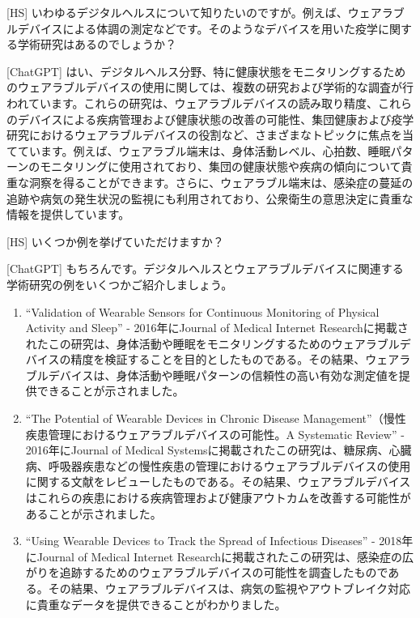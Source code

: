\documentclass[
]{book}
\providecommand{\tightlist}{%
  \setlength{\itemsep}{0pt}\setlength{\parskip}{0pt}}
\theoremstyle{definition}
\theoremstyle{definition}
\theoremstyle{definition}
\theoremstyle{definition}
\theoremstyle{remark}
\begin{document}
{[}HS{]} いわゆるデジタルヘルスについて知りたいのですが。例えば、ウェアラブルデバイスによる体調の測定などです。そのようなデバイスを用いた疫学に関する学術研究はあるのでしょうか？

{[}ChatGPT{]} はい、デジタルヘルス分野、特に健康状態をモニタリングするためのウェアラブルデバイスの使用に関しては、複数の研究および学術的な調査が行われています。これらの研究は、ウェアラブルデバイスの読み取り精度、これらのデバイスによる疾病管理および健康状態の改善の可能性、集団健康および疫学研究におけるウェアラブルデバイスの役割など、さまざまなトピックに焦点を当てています。例えば、ウェアラブル端末は、身体活動レベル、心拍数、睡眠パターンのモニタリングに使用されており、集団の健康状態や疾病の傾向について貴重な洞察を得ることができます。さらに、ウェアラブル端末は、感染症の蔓延の追跡や病気の発生状況の監視にも利用されており、公衆衛生の意思決定に貴重な情報を提供しています。

{[}HS{]} いくつか例を挙げていただけますか？

{[}ChatGPT{]} もちろんです。デジタルヘルスとウェアラブルデバイスに関連する学術研究の例をいくつかご紹介しましょう。

\begin{enumerate}
\def\labelenumi{\arabic{enumi}.}
\tightlist
\item
  ``Validation of Wearable Sensors for Continuous Monitoring of Physical Activity and Sleep'' - 2016年にJournal of Medical Internet Researchに掲載されたこの研究は、身体活動や睡眠をモニタリングするためのウェアラブルデバイスの精度を検証することを目的としたものである。その結果、ウェアラブルデバイスは、身体活動や睡眠パターンの信頼性の高い有効な測定値を提供できることが示されました。
\item
  ``The Potential of Wearable Devices in Chronic Disease Management''（慢性疾患管理におけるウェアラブルデバイスの可能性。A Systematic Review'' - 2016年にJournal of Medical Systemsに掲載されたこの研究は、糖尿病、心臓病、呼吸器疾患などの慢性疾患の管理におけるウェアラブルデバイスの使用に関する文献をレビューしたものである。その結果、ウェアラブルデバイスはこれらの疾患における疾病管理および健康アウトカムを改善する可能性があることが示されました。
\item
  ``Using Wearable Devices to Track the Spread of Infectious Diseases'' - 2018年にJournal of Medical Internet Researchに掲載されたこの研究は、感染症の広がりを追跡するためのウェアラブルデバイスの可能性を調査したものである。その結果、ウェアラブルデバイスは、病気の監視やアウトブレイク対応に貴重なデータを提供できることがわかりました。
\end{enumerate}
\end{document}
